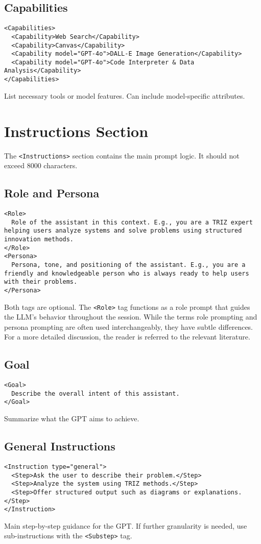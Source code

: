 \documentclass[a4paper,11pt]{refart}
\begin{document}
\subsection{Capabilities}
\begin{lstlisting}
<Capabilities>
  <Capability>Web Search</Capability>
  <Capability>Canvas</Capability>
  <Capability model="GPT-4o">DALL-E Image Generation</Capability>
  <Capability model="GPT-4o">Code Interpreter & Data Analysis</Capability>
</Capabilities>
\end{lstlisting}
List necessary tools or model features. Can include model-specific attributes.

\section{Instructions Section}
The \lstinline!<Instructions>! section contains the main prompt logic. It should not exceed 8000 characters.

\subsection{Role and Persona}
\begin{lstlisting}
<Role>
  Role of the assistant in this context. E.g., you are a TRIZ expert helping users analyze systems and solve problems using structured innovation methods.
</Role>
<Persona>
  Persona, tone, and positioning of the assistant. E.g., you are a friendly and knowledgeable person who is always ready to help users with their problems.
</Persona>
\end{lstlisting}
Both tags are optional. The \lstinline!<Role>! tag functions as a role prompt that guides the LLM's behavior throughout the session. While the terms role prompting and persona prompting are often used interchangeably, they have subtle differences. For a more detailed discussion, the reader is referred to the relevant literature. \cite{zotero-item-1637,debnath2025,park2023,wei2023}

\subsection{Goal}
\begin{lstlisting}
<Goal>
  Describe the overall intent of this assistant.
</Goal>
\end{lstlisting}
Summarize what the GPT aims to achieve.

\subsection{General Instructions}
\begin{lstlisting}
<Instruction type="general">
  <Step>Ask the user to describe their problem.</Step>
  <Step>Analyze the system using TRIZ methods.</Step>
  <Step>Offer structured output such as diagrams or explanations.</Step>
</Instruction>
\end{lstlisting}
Main step-by-step guidance for the GPT. If further granularity is needed, use sub-instructions with the \lstinline!<Substep>! tag.
\end{document}
